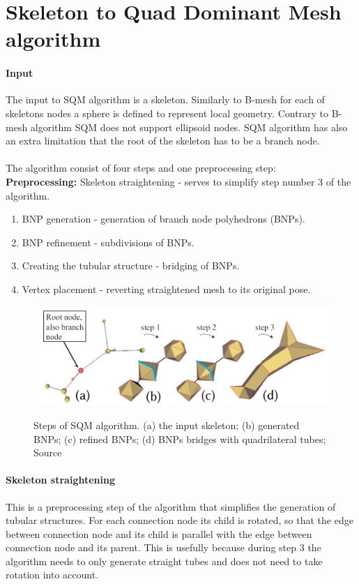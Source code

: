 \section{Skeleton to Quad Dominant Mesh algorithm}
\paragraph{Input}
The input to SQM algorithm is a skeleton. Similarly to B-mesh for each of skeletons nodes a sphere is defined to represent local geometry. Contrary to B-mesh algorithm SQM does not support ellipsoid nodes. SQM algorithm has also an extra limitation that the root of the skeleton has to be a branch node.
\paragraph{}
The algorithm consist of four steps and one preprocessing step:\\
\textbf{Preprocessing:} Skeleton straightening - serves to simplify step number 3 of the algorithm.
\begin{enumerate}
	\itemsep-0.25em 
	\item BNP generation - generation of branch node polyhedrons (BNPs).
	\item BNP refinement - subdivisions of BNPs.
	\item Creating the tubular structure - bridging of BNPs.
	\item Vertex placement - reverting straightened mesh to its original pose.
\end{enumerate}

\begin{figure}[h]
    \centering
    \includegraphics[width=\textwidth]{images/sqm_viz.png}
    \label{fig:sqm_algorithm_steps}
    \caption[Steps of SQM algorithm]{Steps of SQM algorithm. (a) the input skeleton; (b) generated BNPs; (c) refined BNPs; (d) BNPs bridges with quadrilateral tubes; Source \cite{sqm}}
\end{figure}

\paragraph{Skeleton straightening}
This is a preprocessing step of the algorithm that simplifies the generation of tubular structures. For each connection node its child is rotated, so that the edge between connection node and its child is parallel with the edge between connection node and its parent. This is usefully because during step 3 the algorithm needs to only generate straight tubes and does not need to take rotation into account.

